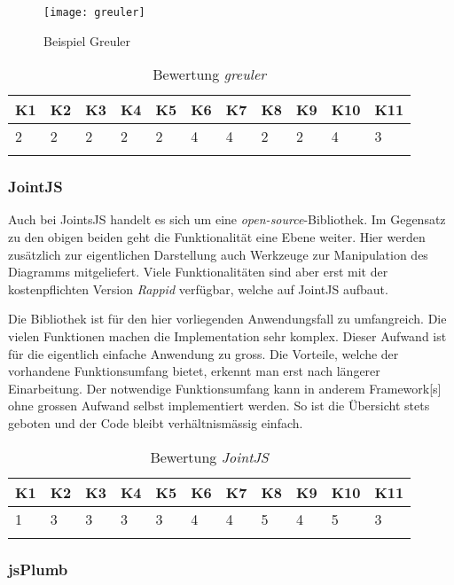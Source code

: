\begin{figure}[htbp]
\centering
\texttt{[image: greuler]}
\caption{Beispiel Greuler}
\label{fig:bsp-greuler}
\end{figure}

\begin{longtable}{|p{0.5cm}|p{0.5cm}|p{0.5cm}|p{0.5cm}|p{0.5cm}|p{0.5cm}|p{0.5cm}|p{0.5cm}|p{0.5cm}|p{0.7cm}|p{0.7cm}|}
  \hline
    K1 & K2 & K3 & K4 & K5 & K6 & K7 & K8 & K9 & K10 & K11 \\\hline
    2 & 2 & 2 & 2 & 2 & 4 & 4 & 2 & 2 & 4 & 3\\\hline
    \caption{Bewertung \textit{greuler}}
  \label{tab:bewertung-greuler}
\end{longtable}

\subsubsection{JointJS}
Auch bei JointsJS handelt es sich um eine \textit{open-source}-Bibliothek. Im Gegensatz zu den obigen beiden geht die Funktionalität eine Ebene weiter. Hier werden zusätzlich zur eigentlichen Darstellung auch Werkzeuge zur Manipulation des Diagramms mitgeliefert. Viele Funktionalitäten sind aber erst mit der kostenpflichten Version \textit{Rappid} ver\-füg\-bar, welche auf JointJS aufbaut. \citep{jointsjs}

Die Bibliothek ist für den hier vorliegenden Anwendungsfall zu umfangreich. Die vielen Funktionen machen die Implementation sehr komplex. Dieser Aufwand ist für die eigentlich einfache Anwendung zu gross. Die Vorteile, welche der vorhandene Funktionsumfang bietet, erkennt man erst nach längerer Einarbeitung. Der notwendige Funktionsumfang kann in anderem \gls{Framework}[s] ohne grossen Aufwand selbst implementiert werden. So ist die Übersicht stets geboten und der Code bleibt verhältnismässig einfach.

\begin{longtable}{|p{0.5cm}|p{0.5cm}|p{0.5cm}|p{0.5cm}|p{0.5cm}|p{0.5cm}|p{0.5cm}|p{0.5cm}|p{0.5cm}|p{0.7cm}|p{0.7cm}|}
  \hline
    K1 & K2 & K3 & K4 & K5 & K6 & K7 & K8 & K9 & K10 & K11 \\\hline
    1 & 3 & 3 & 3 & 3 & 4 & 4 & 5 & 4 & 5 & 3\\\hline
    \caption{Bewertung \textit{JointJS}}
  \label{tab:bewertung-jointjs}
\end{longtable}

\subsubsection{jsPlumb}
\label{jsPlumb}

